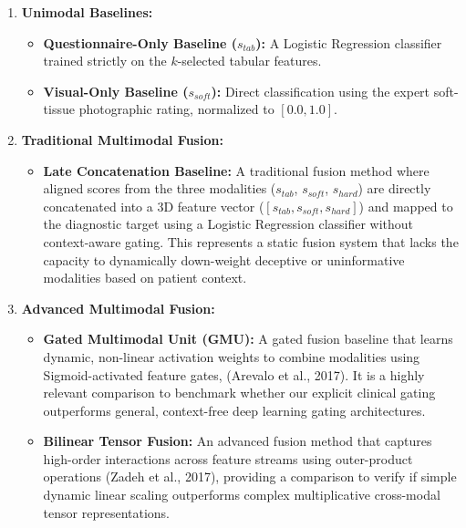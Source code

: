 \documentclass[
]{article}
\providecommand{\tightlist}{%
  \setlength{\itemsep}{0pt}\setlength{\parskip}{0pt}}
\begin{document}
\begin{enumerate}
\def\labelenumi{\arabic{enumi}.}
\item
  \textbf{Unimodal Baselines:}

  \begin{itemize}
  \item
    \textbf{Questionnaire-Only Baseline (}\(s_{tab}\)\textbf{):} A
    Logistic Regression classifier trained strictly on the
    \(k\)-selected tabular features.
  \item
    \textbf{Visual-Only Baseline (}\(s_{soft}\)\textbf{):} Direct
    classification using the expert soft-tissue photographic rating,
    normalized to \([ 0.0,1.0]\).
  \end{itemize}
\item
  \textbf{Traditional Multimodal Fusion:}

  \begin{itemize}
  \tightlist
  \item
    \textbf{Late Concatenation Baseline:} A traditional fusion method
    where aligned scores from the three modalities (\(s_{tab}\),
    \(s_{soft}\), \(s_{hard}\)) are directly concatenated into a 3D
    feature vector (\([ s_{tab},s_{soft},s_{hard}]\)) and mapped to the
    diagnostic target using a Logistic Regression classifier without
    context-aware gating. This represents a static fusion system that
    lacks the capacity to dynamically down-weight deceptive or
    uninformative modalities based on patient context.
  \end{itemize}
\item
  \textbf{Advanced Multimodal Fusion:}

  \begin{itemize}
  \item
    \textbf{Gated Multimodal Unit (GMU):} A gated fusion baseline that
    learns dynamic, non-linear activation weights to combine modalities
    using Sigmoid-activated feature gates, (Arevalo et al., 2017). It is
    a highly relevant comparison to benchmark whether our explicit
    clinical gating outperforms general, context-free deep learning
    gating architectures.
  \item
    \textbf{Bilinear Tensor Fusion:} An advanced fusion method that
    captures high-order interactions across feature streams using
    outer-product operations (Zadeh et al., 2017), providing a
    comparison to verify if simple dynamic linear scaling outperforms
    complex multiplicative cross-modal tensor representations.
  \end{itemize}
\end{enumerate}
\end{document}
